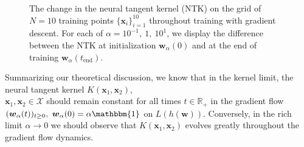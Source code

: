 \documentclass{article}
\begin{document}
\begin{figure}[H]
\centering
{}\hfill
{}\par 
{}
\caption{The change in the neural tangent kernel (NTK) on the grid of $N= 10$ training points $\{ \boldsymbol{x}_i \}_{i=1}^{10}$ throughout training with gradient descent. For each of $\alpha = 10^{-1}, \ 1, \ 10^{1}$, we display the difference between the NTK at initialization $\boldsymbol{w}_{\alpha}(0)$ and at the end of training $\boldsymbol{w}_{\alpha}(t_{\text{end}})$.}\label{img:ntkchange}
\end{figure}

Summarizing our theoretical discussion, we know that in the kernel limit, the neural tangent kernel $K(\boldsymbol{x}_1, \boldsymbol{x}_2)$,\\ $\boldsymbol{x}_1, \boldsymbol{x}_2 \in \mathcal{X}$ should remain constant for all times $t \in \mathbb{R}_+$ in the gradient flow $(\boldsymbol{w}_{\alpha}(t))_{t \geq 0}, \ \boldsymbol{w}_{\alpha}(0) = \alpha \mathbbm{1}$ on $L(h(\boldsymbol{w}))$. Conversely, in the rich limit $\alpha \rightarrow 0$ we should observe that $K(\boldsymbol{x}_1, \boldsymbol{x}_2)$ evolves greatly throughout the gradient flow dynamics.
\end{document}
